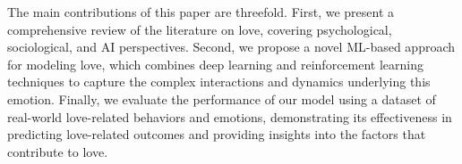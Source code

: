 The main contributions of this paper are threefold. First, we present a comprehensive review of the literature on love, covering psychological, sociological, and AI perspectives. Second, we propose a novel ML-based approach for modeling love, which combines deep learning and reinforcement learning techniques to capture the complex interactions and dynamics underlying this emotion. Finally, we evaluate the performance of our model using a dataset of real-world love-related behaviors and emotions, demonstrating its effectiveness in predicting love-related outcomes and providing insights into the factors that contribute to love.